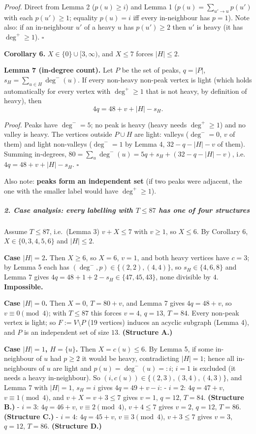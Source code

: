 \emph{Proof.} Direct from Lemma 2 (\(p(u)\ge i\)) and Lemma 1
(\(p(u)=\sum_{u'\to u}p(u')\) with each \(p(u')\ge1\); equality
\(p(u)=i\) iff every in-neighbour has \(p=1\)). Note also: if an
in-neighbour \(u'\) of a heavy \(u\) has \(p(u')\ge2\) then \(u'\) is
heavy (it has \(\deg^+\ge1\)). \(\square\)

\textbf{Corollary 6.} \(X\in\{0\}\cup[3,\infty)\), and \(X\le 7\) forces
\(|H|\le2\).

\textbf{Lemma 7 (in-degree count).} Let \(P\) be the set of peaks,
\(q=|P|\), \(s_H=\sum_{u\in H}\deg^-(u)\). If every non-heavy non-peak
vertex is light (which holds automatically for every vertex with
\(\deg^+\ge1\) that is not heavy, by definition of heavy), then
\[4q=48+v+|H|-s_H .\]

\emph{Proof.} Peaks have \(\deg^-=5\); no peak is heavy (heavy needs
\(\deg^+\ge1\)) and no valley is heavy. The vertices outside \(P\cup H\)
are light: valleys (\(\deg^-=0\), \(v\) of them) and light non-valleys
(\(\deg^-=1\) by Lemma 4, \(32-q-|H|-v\) of them). Summing in-degrees,
\(80=\sum_u\deg^-(u)=5q+s_H+(32-q-|H|-v)\), i.e.~\(4q=48+v+|H|-s_H\).
\(\square\)

Also note: \textbf{peaks form an independent set} (if two peaks were
adjacent, the one with the smaller label would have \(\deg^+\ge1\)).

\subparagraph{\texorpdfstring{2. Case analysis: every labelling with
\(T\le87\) has one of four
structures}{2. Case analysis: every labelling with T\textbackslash le87 has one of four structures}}\label{case-analysis-every-labelling-with-tle87-has-one-of-four-structures}

Assume \(T\le87\), i.e.~(Lemma 3) \(v+X\le7\) with \(v\ge1\), so
\(X\le6\). By Corollary 6, \(X\in\{0,3,4,5,6\}\) and \(|H|\le2\).

\textbf{Case \(|H|=2\).} Then \(X\ge6\), so \(X=6\), \(v=1\), and both
heavy vertices have \(c=3\); by Lemma 5 each has
\((\deg^-,p)\in\{(2,2),(4,4)\}\), so \(s_H\in\{4,6,8\}\) and Lemma 7
gives \(4q=48+1+2-s_H\in\{47,45,43\}\), none divisible by \(4\).
\textbf{Impossible.}

\textbf{Case \(|H|=0\).} Then \(X=0\), \(T=80+v\), and Lemma 7 gives
\(4q=48+v\), so \(v\equiv0\pmod 4\); with \(T\le87\) this forces
\(v=4\), \(q=13\), \(T=84\). Every non-peak vertex is light; so
\(F:=V\setminus P\) (19 vertices) induces an acyclic subgraph (Lemma 4),
and \(P\) is an independent set of size \(13\). \textbf{(Structure A.)}

\textbf{Case \(|H|=1\), \(H=\{u\}\).} Then \(X=c(u)\le6\). By Lemma 5,
if some in-neighbour of \(u\) had \(p\ge2\) it would be heavy,
contradicting \(|H|=1\); hence all in-neighbours of \(u\) are light and
\(p(u)=\deg^-(u)=:i\); \(i=1\) is excluded (it needs a heavy
in-neighbour). So \((i,c(u))\in\{(2,3),(3,4),(4,3)\}\), and Lemma 7 with
\(|H|=1\), \(s_H=i\) gives \(4q=49+v-i\): - \(i=2\): \(4q=47+v\),
\(v\equiv1\pmod4\), and \(v+X=v+3\le7\) gives \(v=1\), \(q=12\),
\(T=84\). \textbf{(Structure B.)} - \(i=3\): \(4q=46+v\),
\(v\equiv2\pmod4\), \(v+4\le7\) gives \(v=2\), \(q=12\), \(T=86\).
\textbf{(Structure C.)} - \(i=4\): \(4q=45+v\), \(v\equiv3\pmod4\),
\(v+3\le7\) gives \(v=3\), \(q=12\), \(T=86\). \textbf{(Structure D.)}

